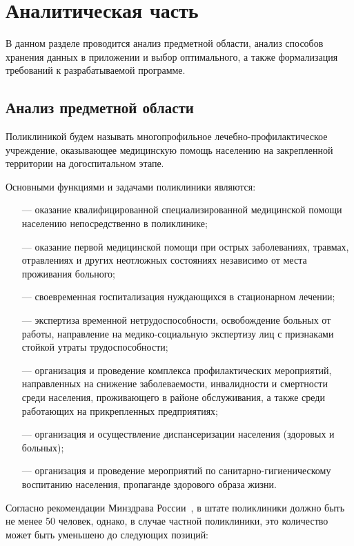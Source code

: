 \section{Аналитическая часть}

В данном разделе проводится анализ предметной области, анализ способов хранения данных в приложении и выбор оптимального, а также формализация требований к разрабатываемой программе.


\subsection{Анализ предметной области}

Поликлиникой будем называть многопрофильное лечебно-профилактическое учреждение, оказывающее медицинскую помощь населению на закрепленной территории на догоспитальном этапе.

Основными функциями и задачами поликлиники являются:

\begin{itemize}[leftmargin=1.6\parindent]
	\item[---] оказание квалифицированной специализированной медицинской помощи населению непосредственно в поликлинике;
	\item[---] оказание первой медицинской помощи при острых заболеваниях, травмах, отравлениях и других неотложных состояниях независимо от места проживания больного;
	\item[---] своевременная госпитализация нуждающихся в стационарном лечении;
	\item[---] экспертиза временной нетрудоспособности, освобождение больных от работы, направление на медико-социальную экспертизу лиц с признаками стойкой утраты трудоспособности;
	\item[---] организация и проведение комплекса профилактических мероприятий, направленных на снижение заболеваемости, инвалидности и смертности среди населения, проживающего в районе обслуживания, а также среди работающих на прикрепленных предприятиях;
	\item[---] организация и осуществление диспансеризации населения (здоровых и больных);
	\item[---] организация и проведение мероприятий по санитарно-гигиеническому воспитанию населения, пропаганде здорового образа жизни.
\end{itemize}

Согласно рекомендации Минздрава России~\cite{minsdrav-state}, в штате поликлиники должно быть не менее 50 человек, однако, в случае частной поликлиники, это количество может быть уменьшено до следующих позиций:


